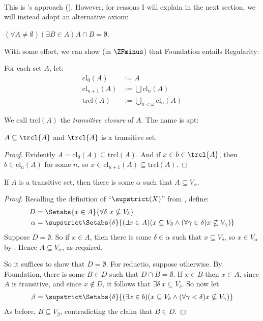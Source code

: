 \documentclass[../../../include/open-logic-section]{subfiles}
\begin{document}
\
\\This is \citeauthor{VonNeumann1925}'s approach (\citeyear{VonNeumann1925}). However, for reasons I will explain in the next section, we will instead adopt an alternative axiom:
\begin{axiom*}[Foundation] $(\forall A \neq \emptyset)(\exists B \in A)A \cap B = \emptyset$.
\end{axiom*}\noindent
With some effort, we can show (in $\ZFminus$) that Foundation entails Regularity:
\begin{defn}
	For each set $A$, let:
	\begin{align*}
		\text{cl}_0(A) &:= A\\
		\text{cl}_{n+1}(A) &:= \bigcup \text{cl}_n(A)\\
		\text{trcl}(A) &:= \bigcup_{n < \omega} \text{cl}_{n}(A)
	\end{align*}
\end{defn}\noindent
We call $\text{trcl}(A)$ the \emph{transitive closure} of $A$. The name is apt:
\begin{prop}\ollabel{subsetoftrcl} $A \subseteq\trcl{A}$ and $\trcl{A}$ is a transitive set. 
\end{prop}
\begin{proof}
	Evidently $A = \text{cl}_0(A) \subseteq \text{trcl}(A)$. And if $x  \in b \in \trcl{A}$,  then $b \in \text{cl}_n(A)$ for some $n$, so $x \in \text{cl}_{n+1}(A) \subseteq \text{trcl}(A)$. 
\end{proof}
\begin{lem} If $A$ is a transitive set, then there is some $\alpha$ such that $A \subseteq V_\alpha$.
\end{lem}
\begin{proof}
	Recalling the definition of ``$\supstrict(X)$'' from , define:
	\begin{align*}
		D  &= \Setabs{x \in A}{\forall \delta\ x \nsubseteq V_\delta}\\
		\alpha &= \supstrict\Setabs{\delta}{(\exists x \in A)(x \subseteq V_\delta \land (\forall \gamma \in \delta)x \nsubseteq V_\gamma)}
	\end{align*}
	Suppose $D = \emptyset$. So if $x \in A$, then there is some $\delta \in \alpha$ such that $x \subseteq V_\delta$, so $x \in V_\alpha$ by . Hence $A \subseteq V_{\alpha}$, as required. 
	
	So it suffices to show that $D = \emptyset$. For reductio, suppose otherwise. By Foundation, there is some $B \in D$ such that $D \cap B = \emptyset$. If $x \in B$ then $x \in A$, since $A$ is transitive, and since $x \notin D$, it follows that $\exists \delta\ x \subseteq V_\delta$. So now let
	\begin{align*}
		\beta = \supstrict\Setabs{\delta}{(\exists x \in b)(x \subseteq V_\delta \land (\forall \gamma < \delta)x \nsubseteq V_\gamma)}
	\end{align*}
	As before, $B \subseteq V_\beta$, contradicting the claim that $B \in D$.	
\end{proof}
\end{document}
